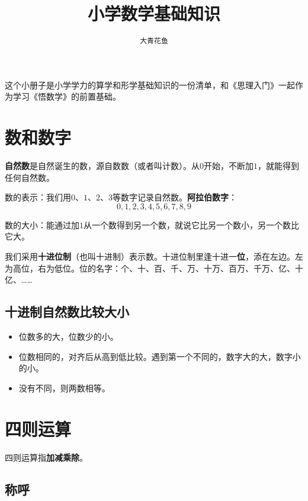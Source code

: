 \documentclass[12pt,UTF8]{ctexart}
\title{\zihao{0} \bfseries 小学数学基础知识}
\author{\zihao{2} \texttt{大青花鱼}}
\date{}
\begin{document}
\maketitle
\tableofcontents
\newpage


\begin{center}
\end{center}


这个小册子是小学学力的算学和形学基础知识的一份清单，和《思理入门》一起作为学习《悟数学》的前置基础。

\section{数和数字}

\textbf{自然数}是自然诞生的数，源自数数（或者叫计数）。从\( 0 \)开始，不断加\( 1 \)，就能得到任何自然数。

数的表示：我们用\( 0 \)、\( 1 \)、\( 2 \)、\( 3 \)等数字记录自然数。\textbf{阿拉伯数字}：
\[ 0,1,2,3,4,5,6,7,8,9 \]

数的大小：能通过加\( 1 \)从一个数得到另一个数，就说它比另一个数小，另一个数比它大。

我们采用\textbf{十进位制}（也叫十进制）表示数。十进位制里逢十进一\textbf{位}，添在左边。左为高位，右为低位。位的名字：个、十、百、千、万、十万、百万、千万、亿、十亿、……

\subsection{十进制自然数比较大小}

\begin{itemize}
\item 位数多的大，位数少的小。
\item 位数相同的，对齐后从高到低比较。遇到第一个不同的，数字大的大，数字小的小。
\item 没有不同，则两数相等。
\end{itemize}

\section{四则运算}

四则运算指\textbf{加减乘除}。

\subsection{称呼}
\end{document}
